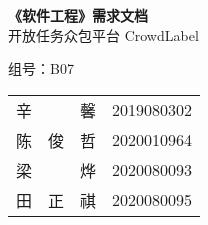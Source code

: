 \vspace*{\fill}
\begin{center}
    \Huge
    \textbf{《软件工程》需求文档}\\
    \vspace{2em}
    开放任务众包平台 CrowdLabel
    
    \vspace{2em}
    \normalsize
    组号：B07
    \vspace{2em}

    \begin{tabular}{p{0.5em}p{0.5em}p{2em}c}
        辛 &    & 馨 &2019080302 \\
        陈 & 俊 & 哲 & 2020010964 \\
        梁 &    & 烨 &2020080093 \\
        田 & 正 & 祺 & 2020080095\\
    \end{tabular}

\end{center}
\vspace*{\fill}
\newpage

\tableofcontents

\newpage
{}